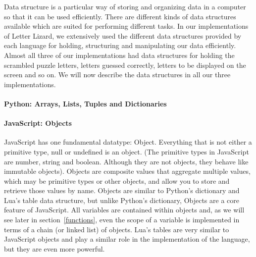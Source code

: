 Data structure is a particular way of storing and organizing data in a computer so that it can be used efficiently. There are different kinds of data structures available which are suited for performing different tasks. In our implementations of Letter Lizard, we extensively used the different data structures provided by each language for holding, structuring and manipulating our data efficiently. Almost all three of our implementations had data structures for holding the scrambled puzzle letters, letters guessed correctly, letters to be displayed on the screen and so on. We will now describe the data structures in all our three implementations.
\paragraph{Python: Arrays, Lists, Tuples and Dictionaries}


\paragraph{JavaScript: Objects}


JavaScript has one fundamental datatype: Object. Everything that is not either a
primitive type, null or undefined is an object. (The primitive types in JavaScript are
number, string and boolean. Although they are not objects, they behave like immutable
objects). Objects are composite values that aggregate multiple values, which may be
primitive types or other objects, and allow you to store and retrieve those values
by name. Objects are similar to Python's dictionary and Lua's table data structure, but
unlike Python's dictionary, Objects are a core feature of JavaScript. All variables are
contained within objects and, as we will see later in section~\ref{functions}, even
the scope of a variable is implemented in terms of a chain (or linked list) of objects.
Lua's tables are very similar to JavaScript objects and play a similar role in the
implementation of the language, but they are even more powerful.

